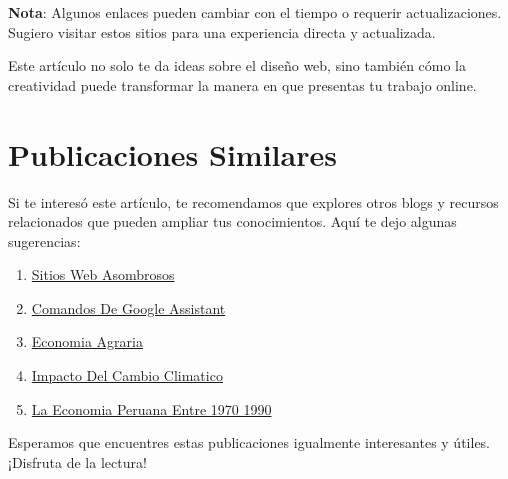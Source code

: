 \documentclass[
  jou,
  floatsintext,
  longtable,
  a4paper,
  nolmodern,
  notxfonts,
  notimes,
  12pt,
  colorlinks=true,linkcolor=blue,citecolor=blue,urlcolor=blue]{apa7}
\providecommand{\tightlist}{%
  \setlength{\itemsep}{0pt}\setlength{\parskip}{0pt}}
\begin{document}
\textbf{Nota}: Algunos enlaces pueden cambiar con el tiempo o requerir
actualizaciones. Sugiero visitar estos sitios para una experiencia
directa y actualizada.

Este artículo no solo te da ideas sobre el diseño web, sino también cómo
la creatividad puede transformar la manera en que presentas tu trabajo
online.

\section{Publicaciones Similares}\label{publicaciones-similares}

Si te interesó este artículo, te recomendamos que explores otros blogs y
recursos relacionados que pueden ampliar tus conocimientos. Aquí te dejo
algunas sugerencias:

\begin{enumerate}
\def\labelenumi{\arabic{enumi}.}
\tightlist
\item
  \href{https://achalmaedison.netlify.app/blog/posts/2017-04-23-sitios-web-asombrosos/index.pdf}{}
  \href{https://achalmaedison.netlify.app/blog/posts/2017-04-23-sitios-web-asombrosos}{Sitios
  Web Asombrosos}
\item
  \href{https://achalmaedison.netlify.app/blog/posts/2020-05-23-comandos-de-google-assistant/index.pdf}{}
  \href{https://achalmaedison.netlify.app/blog/posts/2020-05-23-comandos-de-google-assistant}{Comandos
  De Google Assistant}
\item
  \href{https://achalmaedison.netlify.app/blog/posts/2022-04-22-economia-agraria/index.pdf}{}
  \href{https://achalmaedison.netlify.app/blog/posts/2022-04-22-economia-agraria}{Economia
  Agraria}
\item
  \href{https://achalmaedison.netlify.app/blog/posts/2022-06-02-impacto-del-cambio-climatico/index.pdf}{}
  \href{https://achalmaedison.netlify.app/blog/posts/2022-06-02-impacto-del-cambio-climatico}{Impacto
  Del Cambio Climatico}
\item
  \href{https://achalmaedison.netlify.app/blog/posts/2023-05-12-la-economia-peruana-entre-1970-1990/index.pdf}{}
  \href{https://achalmaedison.netlify.app/blog/posts/2023-05-12-la-economia-peruana-entre-1970-1990}{La
  Economia Peruana Entre 1970 1990}
\end{enumerate}

Esperamos que encuentres estas publicaciones igualmente interesantes y
útiles. ¡Disfruta de la lectura!
\end{document}
